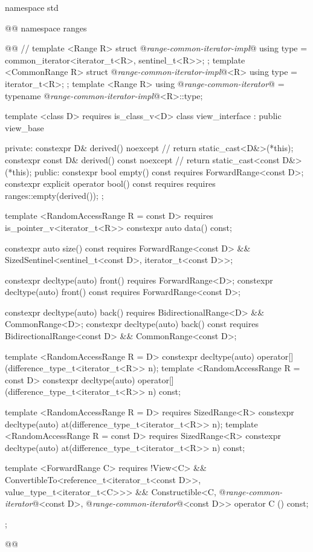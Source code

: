 %
\begin{codeblock}
namespace std { @@ namespace ranges { @@
  // \expos
  template <Range R>
  struct @\textit{range-common-iterator-impl}@ {
    using type = common_iterator<iterator_t<R>, sentinel_t<R>>;
  };
  template <CommonRange R>
  struct @\textit{range-common-iterator-impl}@<R> {
    using type = iterator_t<R>;
  };
  template <Range R>
    using @\textit{range-common-iterator}@ =
      typename @\textit{range-common-iterator-impl}@<R>::type;

  template <class D>
    requires is_class_v<D>
  class view_interface : public view_base {
  private:
    constexpr D& derived() noexcept { // \expos
      return static_cast<D&>(*this);
    }
    constexpr const D& derived() const noexcept { // \expos
      return static_cast<const D&>(*this);
    }
  public:
    constexpr bool empty() const requires ForwardRange<const D>;
    constexpr explicit operator bool() const
      requires requires { ranges::empty(derived()); };

    template <RandomAccessRange R = const D>
        requires is_pointer_v<iterator_t<R>>
      constexpr auto data() const;

    constexpr auto size() const requires ForwardRange<const D> &&
      SizedSentinel<sentinel_t<const D>, iterator_t<const D>>;

    constexpr decltype(auto) front() requires ForwardRange<D>;
    constexpr decltype(auto) front() const requires ForwardRange<const D>;

    constexpr decltype(auto) back()
      requires BidirectionalRange<D> && CommonRange<D>;
    constexpr decltype(auto) back() const
      requires BidirectionalRange<const D> && CommonRange<const D>;

    template <RandomAccessRange R = D>
      constexpr decltype(auto) operator[](difference_type_t<iterator_t<R>> n);
    template <RandomAccessRange R = const D>
      constexpr decltype(auto) operator[](difference_type_t<iterator_t<R>> n) const;

    template <RandomAccessRange R = D>
        requires SizedRange<R>
      constexpr decltype(auto) at(difference_type_t<iterator_t<R>> n);
    template <RandomAccessRange R = const D>
        requires SizedRange<R>
      constexpr decltype(auto) at(difference_type_t<iterator_t<R>> n) const;

    template <ForwardRange C>
        requires !View<C> &&
          ConvertibleTo<reference_t<iterator_t<const D>>, value_type_t<iterator_t<C>>> &&
          Constructible<C, @\textit{range-common-iterator}@<const D>, @\textit{range-common-iterator}@<const D>>
      operator C () const;
  };
}}@\removed{\}\}}@
\end{codeblock}

